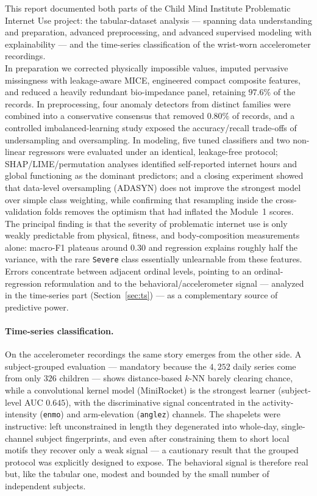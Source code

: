 This report documented both parts of the Child Mind Institute Problematic Internet Use project: the tabular-dataset analysis --- spanning data understanding and preparation, advanced preprocessing, and advanced supervised modeling with explainability --- and the time-series classification of the wrist-worn accelerometer recordings.\\

In preparation we corrected physically impossible values, imputed pervasive missingness with leakage-aware MICE, engineered compact composite features, and reduced a heavily redundant bio-impedance panel, retaining $97.6\%$ of the records. In preprocessing, four anomaly detectors from distinct families were combined into a conservative consensus that removed $0.80\%$ of records, and a controlled imbalanced-learning study exposed the accuracy/recall trade-offs of undersampling and oversampling. In modeling, five tuned classifiers and two non-linear regressors were evaluated under an identical, leakage-free protocol; SHAP/LIME/permutation analyses identified self-reported internet hours and global functioning as the dominant predictors; and a closing experiment showed that data-level oversampling (ADASYN) does not improve the strongest model over simple class weighting, while confirming that resampling inside the cross-validation folds removes the optimism that had inflated the Module~1 scores.\\

The principal finding is that the severity of problematic internet use is only weakly predictable from physical, fitness, and body-composition measurements alone: macro-F1 plateaus around $0.30$ and regression explains roughly half the variance, with the rare \texttt{Severe} class essentially unlearnable from these features. Errors concentrate between adjacent ordinal levels, pointing to an ordinal-regression reformulation and to the behavioral/accelerometer signal --- analyzed in the time-series part (Section~\ref{sec:ts}) --- as a complementary source of predictive power.\\

\paragraph{Time-series classification.} On the accelerometer recordings the same story emerges from the other side. A subject-grouped evaluation --- mandatory because the $4{,}252$ daily series come from only $326$ children --- shows distance-based $k$-NN barely clearing chance, while a convolutional kernel model (MiniRocket) is the strongest learner (subject-level AUC $0.645$), with the discriminative signal concentrated in the activity-intensity (\texttt{enmo}) and arm-elevation (\texttt{anglez}) channels. The shapelets were instructive: left unconstrained in length they degenerated into whole-day, single-channel subject fingerprints, and even after constraining them to short local motifs they recover only a weak signal --- a cautionary result that the grouped protocol was explicitly designed to expose. The behavioral signal is therefore real but, like the tabular one, modest and bounded by the small number of independent subjects.\\

